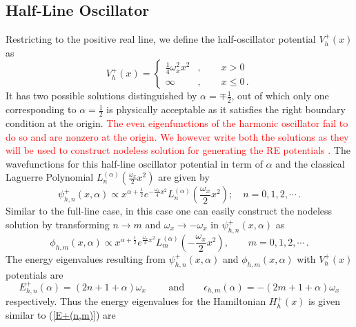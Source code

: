 \documentclass[12pt]{article}
\numberwithin{equation}{section} %
\begin{document}
\subsection{Half-Line Oscillator}
Restricting to the positive real line, we define the half-oscillator potential 
$V_h^+(x)$ as
\begin{equation}\label{HLO:V+}
    V_h^+(x)=\begin{cases}
        \frac{1}{4}\omega_x^2 x^2 &,\qquad x>0\\
        \infty &,\qquad x\leq 0\,.
    \end{cases}
\end{equation}
It has two possible solutions distinguished by \(\alpha=\mp\frac{1}{2}\), out of which only one corresponding to \(\alpha=\frac{1}{2}\) is physically 
acceptable \cite{carballo2004polynomial,morales2015truncated} as it satisfies 
the right boundary condition at the origin. \textcolor{red}{The even eigenfunctions of the harmonic oscillator fail to do so and are nonzero at the origin. We however write both the solutions as they will be used to construct nodeless solution for generating the RE potentials \cite{morales2015truncated}.} The wavefunctions for this half-line oscillator potential in term 
of $\alpha$ and the classical Laguerre Polynomial 
$L_n^{(\alpha) }\left(\frac{\omega_x}{2} x^2\right)$ are given by
\begin{equation}\label{HLO:psi+}
\psi_{h,n}^+(x,\alpha)\propto x^{\alpha +\frac{1}{2}} 
e^{-\frac{\omega_x}{4} x^2} L_n^{(\alpha) }\left(\frac{\omega_x}{2} x^2\right);
\quad n=0,1,2,\cdots\,.
\end{equation} 
Similar to the full-line case, in this case one can easily construct the nodeless solution by transforming $n\rightarrow m$ and 
$\omega_x\rightarrow-\omega_x$ \cite{grandati2012rational} in $\psi_{h,n}^+(x,\alpha)$ as
\begin{equation}\label{HLO:phi}
\phi_{h,m}(x,\alpha)\propto x^{\alpha +\frac{1}{2}} e^{\frac{\omega_x}{4} x^2} 
L_m^{(\alpha )}\left(-\frac{\omega_x}{2} x^2\right),\qquad m=0,1,2,\cdots \,.
\end{equation}
The energy eigenvalues resulting from $\psi_{h,n}^+(x,\alpha)$ and 
$\phi_{h,m}(x,\alpha)$ with $V^+_h(x)$ potentials are
\begin{equation}
E^+_{h,n}(\alpha)=(2n+1+\alpha)\omega_x \qquad\text{ and}\qquad 
\epsilon_{h,m}(\alpha)=-(2m+1+\alpha)\omega_x
\end{equation}
respectively. Thus the energy eigenvalues for the Hamiltonian 
$H_h^+(x)$ is given similar to (\ref{E+(n,m)}) are
\end{document}
